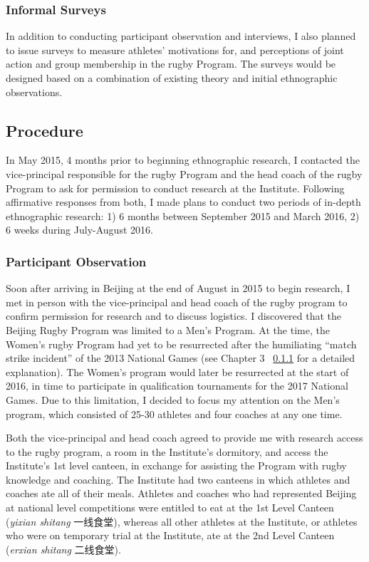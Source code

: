     \subsubsection{Informal Surveys}
    In addition to conducting participant observation and interviews, I also planned to issue surveys to measure athletes' motivations for, and perceptions of joint action and group membership in the rugby Program.  The surveys would be designed based on a combination of existing theory and initial ethnographic observations.


  \subsection{Procedure}

  In May 2015, 4 months prior to beginning ethnographic research, I contacted the vice-principal responsible for the rugby Program and the head coach of the rugby Program to ask for permission to conduct research at the Institute.  Following affirmative responses from both, I made plans to conduct two periods of in-depth ethnographic research: 1) 6 months between September 2015 and March 2016, 2) 6 weeks during July-August 2016.

  \subsubsection{Participant Observation}
  Soon after arriving in Beijing at the end of August in 2015 to begin research, I met in person with the vice-principal and head coach of the rugby program to confirm permission for research and to discuss logistics.  I discovered that the Beijing Rugby Program was limited to a Men's Program.  At the time, the Women's rugby Program had yet to be resurrected after the humiliating ``match strike incident'' of the 2013 National Games (see Chapter 3 ~\ref{} for a detailed explanation). The Women's program would later be resurrected at the start of 2016, in time to participate in qualification tournaments for the 2017 National Games.  Due to this limitation, I decided to focus my attention on the Men's program, which consisted of 25-30 athletes and four coaches at any one time.

  Both the vice-principal and head coach agreed to provide me with research access to the rugby program, a room in the Institute's dormitory, and access the Institute's 1st level canteen, in exchange for assisting the Program with rugby knowledge and coaching.   The Institute had two canteens in which athletes and coaches ate all of their meals.  Athletes and coaches who had represented Beijing at national level competitions were entitled to eat at the 1st Level Canteen (\textit{yixian shitang} 一线食堂), whereas all other athletes at the Institute, or athletes who were on temporary trial at the Institute, ate at the 2nd Level Canteen (\textit{erxian shitang} 二线食堂).

